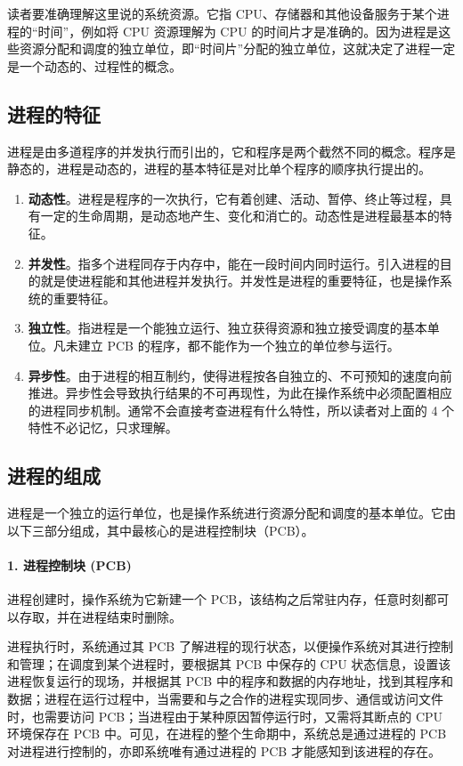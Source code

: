 \documentclass{ctexbook}
\begin{document}
	读者要准确理解这里说的系统资源。它指 CPU、存储器和其他设备服务于某个进程的“时间”，例如将 CPU 资源理解为 CPU 的时间片才是准确的。因为进程是这些资源分配和调度的独立单位，即“时间片”分配的独立单位，这就决定了进程一定是一个动态的、过程性的概念。
	
	\subsection{进程的特征}
	
	进程是由多道程序的并发执行而引出的，它和程序是两个截然不同的概念。程序是静态的，进程是动态的，进程的基本特征是对比单个程序的顺序执行提出的。
	
	\begin{enumerate}
		\item \textbf{动态性}。进程是程序的一次执行，它有着创建、活动、暂停、终止等过程，具有一定的生命周期，是动态地产生、变化和消亡的。动态性是进程最基本的特征。
		\item \textbf{并发性}。指多个进程同存于内存中，能在一段时间内同时运行。引入进程的目的就是使进程能和其他进程并发执行。并发性是进程的重要特征，也是操作系统的重要特征。
		\item \textbf{独立性}。指进程是一个能独立运行、独立获得资源和独立接受调度的基本单位。凡未建立 PCB 的程序，都不能作为一个独立的单位参与运行。
		\item \textbf{异步性}。由于进程的相互制约，使得进程按各自独立的、不可预知的速度向前推进。异步性会导致执行结果的不可再现性，为此在操作系统中必须配置相应的进程同步机制。通常不会直接考查进程有什么特性，所以读者对上面的 4 个特性不必记忆，只求理解。
	\end{enumerate}
	
	\subsection{进程的组成}
	
	进程是一个独立的运行单位，也是操作系统进行资源分配和调度的基本单位。它由以下三部分组成，其中最核心的是进程控制块（PCB）。
	
	\paragraph{1. 进程控制块 (PCB)}
	
	进程创建时，操作系统为它新建一个 PCB，该结构之后常驻内存，任意时刻都可以存取，并在进程结束时删除。
	
	进程执行时，系统通过其 PCB 了解进程的现行状态，以便操作系统对其进行控制和管理；在调度到某个进程时，要根据其 PCB 中保存的 CPU 状态信息，设置该进程恢复运行的现场，并根据其 PCB 中的程序和数据的内存地址，找到其程序和数据；进程在运行过程中，当需要和与之合作的进程实现同步、通信或访问文件时，也需要访问 PCB；当进程由于某种原因暂停运行时，又需将其断点的 CPU 环境保存在 PCB 中。可见，在进程的整个生命期中，系统总是通过进程的 PCB 对进程进行控制的，亦即系统唯有通过进程的 PCB 才能感知到该进程的存在。
	
\end{document}
